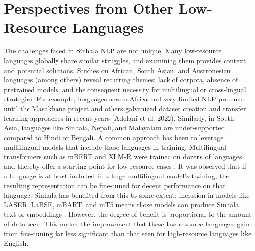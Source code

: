 \documentclass[12pt]{uomthesis}
\begin{document}
\section{Perspectives from Other Low-Resource Languages}
The challenges faced in Sinhala NLP are not unique. Many low-resource languages globally share similar struggles, and examining them provides context and potential solutions. Studies on African, South Asian, and Austronesian languages (among others) reveal recurring themes: lack of corpora, absence of pretrained models, and the consequent necessity for multilingual or cross-lingual strategies. For example, languages across Africa had very limited NLP presence until the Masakhane project and others galvanized dataset creation and transfer learning approaches in recent years (Adelani et al. 2022). Similarly, in South Asia, languages like Sinhala, Nepali, and Malayalam are under-supported compared to Hindi or Bengali. A common approach has been to leverage multilingual models that include these languages in training. Multilingual transformers such as mBERT and XLM-R were trained on dozens of languages and thereby offer a starting point for low-resource cases \cite{2}. It was observed that if a language is at least included in a large multilingual model’s training, the resulting representation can be fine-tuned for decent performance on that language. Sinhala has benefited from this to some extent: inclusion in models like LASER, LaBSE, mBART, and mT5 means those models can produce Sinhala text or embeddings \cite{1} \cite{6}. However, the degree of benefit is proportional to the amount of data seen. This makes the improvement that these low-resource languages gain from fine-tuning far less significant than that seen for high-resource languages like English.
\end{document}
